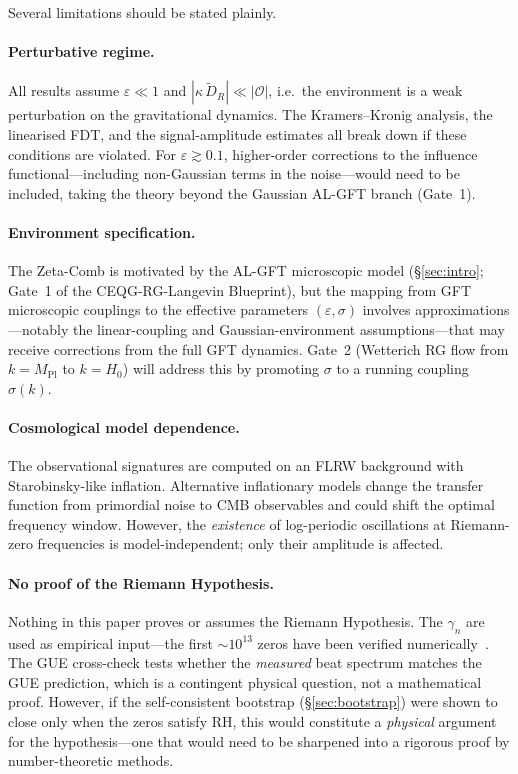 \documentclass[12pt,a4paper]{article}
\begin{document}
Several limitations should be stated plainly.

\paragraph{Perturbative regime.}
All results assume $\varepsilon \ll 1$ and
$|\kappa\,\widetilde{D}_{R}| \ll |\mathcal{O}|$,
i.e.\ the environment is a weak perturbation on the
gravitational dynamics.
The Kramers--Kronig analysis, the linearised FDT, and
the signal-amplitude estimates all break down if these
conditions are violated.
For $\varepsilon \gtrsim 0.1$, higher-order corrections
to the influence functional---including non-Gaussian
terms in the noise---would need to be included, taking
the theory beyond the Gaussian AL-GFT branch (Gate~1).

\paragraph{Environment specification.}
The Zeta-Comb is motivated by the AL-GFT microscopic model
(\S\ref{sec:intro}; Gate~1 of the CEQG-RG-Langevin
Blueprint), but the mapping from GFT microscopic
couplings to the effective parameters
$(\varepsilon,\sigma)$ involves approximations---notably
the linear-coupling and Gaussian-environment
assumptions---that may receive corrections from the
full GFT dynamics.
Gate~2 (Wetterich RG flow from $k = M_{\mathrm{Pl}}$
to $k = H_{0}$) will address this by promoting
$\sigma$ to a running coupling $\sigma(k)$.

\paragraph{Cosmological model dependence.}
The observational signatures are computed on an FLRW
background with Starobinsky-like inflation.
Alternative inflationary models change the transfer
function from primordial noise to CMB observables and
could shift the optimal frequency window.
However, the \emph{existence} of log-periodic oscillations
at Riemann-zero frequencies is model-independent; only
their amplitude is affected.

\paragraph{No proof of the Riemann Hypothesis.}
Nothing in this paper proves or assumes the Riemann
Hypothesis.
The $\gamma_{n}$ are used as empirical input---the
first $\sim 10^{13}$ zeros have been verified
numerically~\cite{Platt2021,Odlyzko1987}.
The GUE cross-check tests whether the \emph{measured}
beat spectrum matches the GUE prediction, which is a
contingent physical question, not a mathematical proof.
However, if the self-consistent bootstrap
(\S\ref{sec:bootstrap}) were shown to close only when
the zeros satisfy RH, this would constitute a
\emph{physical} argument for the hypothesis---one that
would need to be sharpened into a rigorous proof by
number-theoretic methods.
\end{document}
